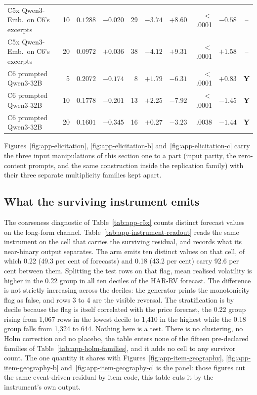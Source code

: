 \begin{table}[htbp]
\begin{tabular}{@{}lrrrrrrrrc@{}}
C5x Qwen3-Emb.\ on C6's excerpts & 10 & $0.1288$ & $-0.020$ & 29 & $-3.74$ & $+8.60$ & $<$.0001 & $-0.58$ & -- \\
C5x Qwen3-Emb.\ on C6's excerpts & 20 & $0.0972$ & $+0.036$ & 38 & $-4.12$ & $+9.31$ & $<$.0001 & $+1.58$ & -- \\
\addlinespace
C6 prompted Qwen3-32B & 5 & $0.2072$ & $-0.174$ & 8 & $+1.79$ & $-6.31$ & $<$.0001 & $+0.83$ & \textbf{Y} \\
C6 prompted Qwen3-32B & 10 & $0.1778$ & $-0.201$ & 13 & $+2.25$ & $-7.92$ & $<$.0001 & $-1.45$ & \textbf{Y} \\
C6 prompted Qwen3-32B & 20 & $0.1601$ & $-0.345$ & 16 & $+0.27$ & $-3.23$ & .0038 & $-1.44$ & \textbf{Y} \\
\bottomrule
\end{tabular}
\end{table}

Figures~\ref{fig:app-elicitation}, \ref{fig:app-elicitation-b} and~\ref{fig:app-elicitation-c} carry the three
input manipulations of this section one to a part (input parity, the zero-content
prompts, and the same construction inside the replication family) with their
three separate multiplicity families kept apart.

\subsection{What the surviving instrument emits}

The coarseness diagnostic of Table~\ref{tab:app-c5x} counts distinct forecast
values on the long-form channel. Table~\ref{tab:app-instrument-readout} reads
the same instrument on the cell that carries the surviving residual, and
records what its near-binary output separates. The arm emits ten distinct
values on that cell, of which 0.22 (49.3 per cent of forecasts) and 0.18 (43.2
per cent) carry 92.6 per cent between them. %
Splitting the test rows on that flag, mean realised volatility is higher in the
0.22 group in all ten deciles of the HAR-RV forecast. The difference is not
strictly increasing across the deciles: the generator prints the monotonicity
flag as false, and rows 3 to 4 are the visible reversal. %
The stratification is by decile because the flag is itself correlated with the
price forecast, the 0.22 group rising from 1{,}067 rows in the lowest decile to
1{,}410 in the highest while the 0.18 group falls from 1{,}324 to 644. Nothing
here is a test. There is no clustering, no Holm correction and no placebo, the
table enters none of the fifteen pre-declared families of
Table~\ref{tab:app-holm-families}, and it adds no cell to any survivor count.
The one quantity it shares with Figures~\ref{fig:app-item-geography}, \ref{fig:app-item-geography-b} and~\ref{fig:app-item-geography-c} is the
panel: those figures cut the same event-driven residual by item code, this table
cuts it by the instrument's own output.

